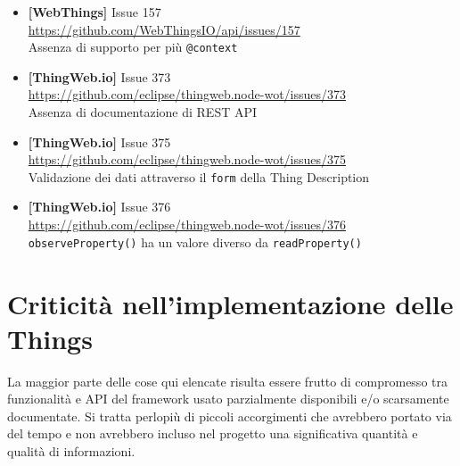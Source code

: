 \documentclass[12pt,a4paper,openright,oneside]{report}
\begin{document}
\begin{itemize}
	\item \textbf{[WebThings]} Issue 157\\
	\url{https://github.com/WebThingsIO/api/issues/157}\\
	Assenza di supporto per più \texttt{@context}
	
	\item \textbf{[ThingWeb.io]} Issue 373\\
	\url{https://github.com/eclipse/thingweb.node-wot/issues/373}\\
	Assenza di documentazione di REST API
	
	\item \textbf{[ThingWeb.io]} Issue 375\\
	\url{https://github.com/eclipse/thingweb.node-wot/issues/375}\\
	Validazione dei dati attraverso il \texttt{form} della Thing Description
	
	\item \textbf{[ThingWeb.io]} Issue 376\\
	\url{https://github.com/eclipse/thingweb.node-wot/issues/376}\\
	\texttt{observeProperty()} ha un valore diverso da \texttt{readProperty()}\\
\end{itemize}




\section{Criticità nell'implementazione delle Things}
La maggior parte delle cose qui elencate risulta essere frutto di compromesso tra funzionalità e API del framework usato parzialmente disponibili e/o scarsamente documentate. Si tratta perlopiù di piccoli accorgimenti che avrebbero portato via del tempo e non avrebbero incluso nel progetto una significativa quantità e qualità di informazioni.
\end{document}
